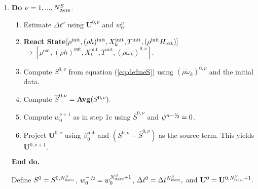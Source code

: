 \documentclass[11pt]{article}
\newcommand{\sfrac}[2]{\mathchoice
  {\kern0em\raise.5ex\hbox{\the\scriptfont0 #1}\kern-.15em/
   \kern-.15em\lower.25ex\hbox{\the\scriptfont0 #2}}
  {\kern0em\raise.5ex\hbox{\the\scriptfont0 #1}\kern-.15em/
   \kern-.15em\lower.25ex\hbox{\the\scriptfont0 #2}}
  {\kern0em\raise.5ex\hbox{\the\scriptscriptfont0 #1}\kern-.2em/
   \kern-.15em\lower.25ex\hbox{\the\scriptscriptfont0 #2}}
  {#1\!/#2}}
\newcommand{\myhalf}{\sfrac{1}{2}}
\newcommand{\nmh}{{n - \myhalf}}
\newcommand{\Hext}{{H_{\rm ext}}}
\newcommand{\initp}{\mathrm{init}}
\newcommand{\outp}{\mathrm{out}}
\newcommand{\dt}{\Delta t}
\newcommand{\ubold}{\mathbf{U}}
\newcommand{\omegadot}{\dot{\omega}}
\begin{document}
\begin{enumerate}
\renewcommand{\theenumi}{{\bf \alph{enumi}}}
\renewcommand{\labelenumii}{\roman{enumii}.}

\item {\bf Do} {$\nu = 1,...,N_{\rm iters}^{S}$.}
  \begin{enumerate}

  \item Estimate $\Delta t^\nu$ using $\ubold^{0,\nu}$ and $w_0^\nu.$

  \item {\bf React State}$[ \rho^{\initp},(\rho h)^{\initp}, X_k^{\initp}, T^{\initp}, (\rho^{\initp} \Hext) ]$\\
      $\rightarrow [\rho^{\outp}, (\rho h)^{\outp}, X_k^{\outp}, T^{\outp}, (\rho \omegadot_k)^{0,\nu} ].$

  \item Compute $S^{0,\nu}$ from equation (\ref{eq:defineS}) 
        using $(\rho \omegadot_k)^{0,\nu}$ and the initial data.

  \item Compute $\overline{S}^{0,\nu} = {\mathrm{\bf Avg}} (S^{0,\nu}).$

  \item Compute $w_0^{\nu+1}$ as in step 1c using $\overline{S}^{0,\nu}$ and $\psi^{\nmh} = 0$.
        

  \item Project $\ubold^{0,\nu}$ using $\beta_0^{\initp}$ and 
        $(S^{0,\nu} - \overline{S}^{0,\nu})$ as the source term.  
        This yields $\ubold^{0,\nu+1}.$

  \end{enumerate}

  {\bf End do.}

  Define $S^0 = S^{0,N_{\rm iters}^S}$, $w_0^{-\myhalf} = w_0^{N_{\rm iters}^S+1}$, 
$\dt^0 = \Delta t^{N_{\rm iters}^S},$ and $\ubold^0 = \ubold^{0,N_{\rm iters}^S+1}.$

\end{enumerate}
\end{document}
